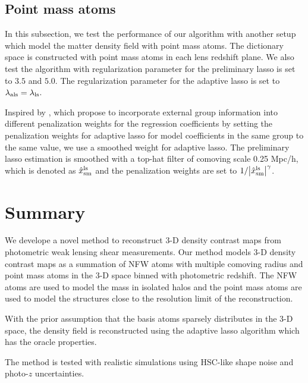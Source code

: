 \documentclass[twocolumn]{aastex62}
\begin{document}
\subsection{Point mass atoms}
\label{subsec:test-pm}
In this subsection, we test the performance of our algorithm with another setup which model the matter density
field with point mass atoms.
The dictionary space is constructed with point mass atoms in each lens redshift plane.
We also test the algorithm with regularization parameter for the preliminary lasso is set to $3.5$ and $5.0$. The 
regularization parameter for the adaptive lasso is set to $\lambda_{\rm{als}}=\lambda_{\rm{ls}}$.

Inspired by \citet{structureAdaLasso-Pramanik2020}, which propose to incorporate external group information into 
different penalization weights for the regression coefficients by setting the penalization weights for adaptive lasso
for model coefficients in the same group to the same value, we use a smoothed weight for adaptive lasso. The preliminary
lasso estimation is smoothed with a top-hat filter of comoving scale 0.25 Mpc/h, which is denoted as 
$\hat{x}^{\rm{ls}}_{\rm{sm}}$ and the penalization weights are set to $1/\abs{\hat{x}^{\rm{ls}}_{\rm{sm}}}^\gamma$.



\section{Summary}
\label{sec:Sum}

We develope a novel method to reconstruct $3$-D density contrast maps from photometric weak lensing shear measurements.
Our method models $3$-D density contrast maps as a summation of NFW atoms with multiple comoving radius and point mass atoms
in the $3$-D space binned with photometric redshift. The NFW atoms are used to model the mass in isolated halos and the 
point mass atoms are used to model the structures close to the resolution limit of the reconstruction. 

With the prior assumption that the basis atoms sparsely distributes in the $3$-D space, the density field is reconstructed 
using the adaptive lasso algorithm \citep{AdaLASSO-Zou2006} which has the oracle properties. 


The method is tested with realistic simulations using HSC-like shape noise and photo-$z$ uncertainties.





\appendix
\end{document}
